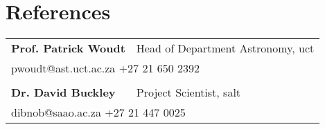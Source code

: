 \documentclass{article}
\newcommand{\tb}{\textbullet}
\newcommand{\tblblt}[2]{%
  \multicolumn{#1}{l}{\hspace{10pt}\tb\hspace{10pt}\parbox{0.9\textwidth}{#2}}%
  }
\newcommand{\reference}[5]{%
  \textbf{#1} 	& #2, #3 										\\
  \multicolumn{2}{l}{\hspace{20pt}\tb\hspace{20pt}#4  \hspace{20pt}\tb\hspace{20pt} #5}	\\
 }
\newcommand{\uct}{\gls*{uct}\xspace}
\newcommand{\salt}{\acrshort*{salt}\xspace}
\begin{document}
\section{References}


  \begin{tabular}{l l}
    
    \reference{Prof. Patrick Woudt}{Head of Department Astronomy}{\uct}{pwoudt@ast.uct.ac.za}{+27 21 650 2392}	
    \\
    \reference{Dr. David Buckley}{Project Scientist}{\salt}{dibnob@saao.ac.za}{+27 21 447 0025}
  
  \end{tabular}



 
 
 
\end{document}
